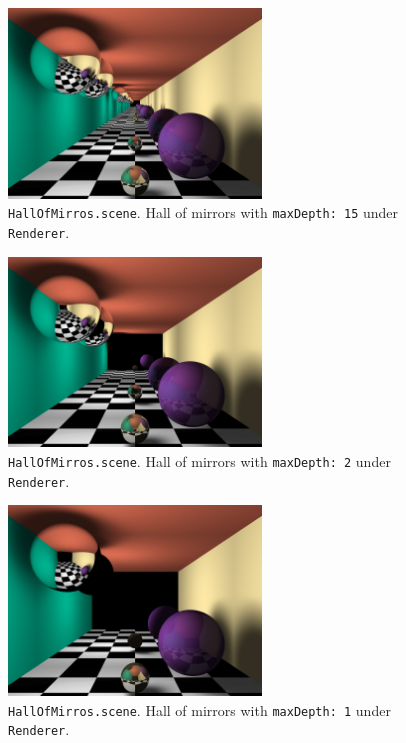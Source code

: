 \documentclass{article}
\begin{document}
\begin{figure}[H]
    \centering
    \includegraphics[width=0.6\textwidth]{./examples/HallOfMirrors.png}
    \caption{\texttt{HallOfMirros.scene}. Hall of mirrors with \texttt{maxDepth: 15} under \texttt{Renderer}.}
\end{figure}

\begin{figure}[H]
    \centering
    \includegraphics[width=0.6\textwidth]{./examples/HallOfMirrorsDepth2.png}
    \caption{\texttt{HallOfMirros.scene}. Hall of mirrors with \texttt{maxDepth: 2} under \texttt{Renderer}.}
\end{figure}

\begin{figure}[H]
    \centering
    \includegraphics[width=0.6\textwidth]{./examples/HallOfMirrorsDepth3.png}
    \caption{\texttt{HallOfMirros.scene}. Hall of mirrors with \texttt{maxDepth: 1} under \texttt{Renderer}.}
\end{figure}
\end{document}
